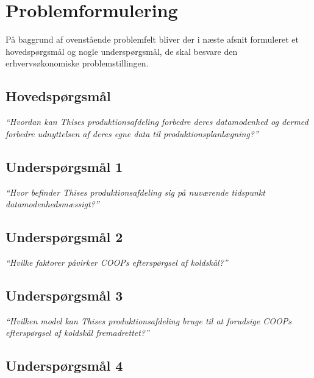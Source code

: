 \documentclass[
  12pt,
  a4paper,
  DIV=11,
  numbers=noendperiod]{scrartcl}
\begin{document}
\hypertarget{problemformulering}{%
\section{Problemformulering}\label{problemformulering}}

På baggrund af ovenstående problemfelt bliver der i næste afsnit
formuleret et hovedspørgsmål og nogle underspørgsmål, de skal besvare
den erhvervsøkonomiske problemstillingen.

\hypertarget{hovedspuxf8rgsmuxe5l}{%
\subsection{Hovedspørgsmål}\label{hovedspuxf8rgsmuxe5l}}

\emph{``Hvordan kan Thises produktionsafdeling forbedre deres
datamodenhed og dermed forbedre udnyttelsen af deres egne data til
produktionsplanlægning?''}

\hypertarget{underspuxf8rgsmuxe5l-1}{%
\subsection{Underspørgsmål 1}\label{underspuxf8rgsmuxe5l-1}}

\emph{``Hvor befinder Thises produktionsafdeling sig på nuværende
tidspunkt datamodenhedsmæssigt?''}

\hypertarget{underspuxf8rgsmuxe5l-2}{%
\subsection{Underspørgsmål 2}\label{underspuxf8rgsmuxe5l-2}}

\emph{``Hvilke faktorer påvirker COOPs efterspørgsel af koldskål?''}

\hypertarget{underspuxf8rgsmuxe5l-3}{%
\subsection{Underspørgsmål 3}\label{underspuxf8rgsmuxe5l-3}}

\emph{``Hvilken model kan Thises produktionsafdeling bruge til at
forudsige COOPs efterspørgsel af koldskål fremadrettet?''}

\hypertarget{underspuxf8rgsmuxe5l-4}{%
\subsection{Underspørgsmål 4}\label{underspuxf8rgsmuxe5l-4}}
\end{document}
